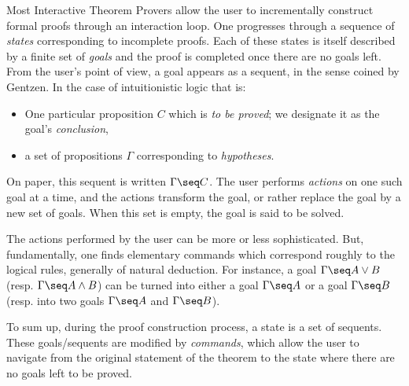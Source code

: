 


% 



Most Interactive Theorem Provers allow the user to incrementally construct
formal proofs through an interaction loop. One progresses
through a sequence of {\em states} corresponding to incomplete proofs. Each
of these states is itself described by a finite set of {\em goals} and
the proof is completed once there are no goals left.
From the user's point of view, a goal appears as a sequent, in the
sense coined by Gentzen. In the case of intuitionistic logic that is:
\begin{itemize}
	\item One particular proposition $C$ which is {\em to be proved}; we
  designate it as the goal's {\em conclusion},
	\item a set of propositions $\Gamma$ corresponding to {\em hypotheses}.
\end{itemize}
On paper, this sequent is written $\Gamma\seq C$.  The user performs
{\em actions} on one such goal at a time, and the actions transform
the goal, or rather replace the goal by a new set of goals. When this
set is empty, the goal is said to be solved.

The actions performed by the user can be more or less
sophisticated. But, fundamentally, one finds elementary commands which
correspond roughly to the logical rules, generally of natural
deduction. For instance, a goal $\Gamma\seq A\vee B$
(resp. $\Gamma\seq A\wedge B$) can be turned into either a goal
$\Gamma\seq A$ or a goal $\Gamma\seq B$ (resp. into two goals
$\Gamma\seq A$ and $\Gamma\seq B$).

To sum up, during the proof construction process, a state is a set of
sequents. These goals/sequents are modified by {\em commands}, which
allow the user to navigate from the original statement of the theorem
to the state where there are no goals left to be proved.

